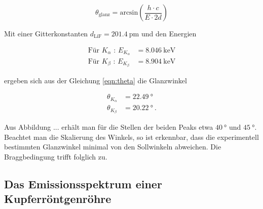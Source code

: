 \begin{equation}
  \theta_\text{glanz} = \text{arcsin}\left(\frac{h \cdot c}{E \cdot 2d}\right)
  \label{eqn:theta}
\end{equation}

Mit einer Gitterkonstanten $d_\text{LiF} = \SI{201.4}{\pico\meter}$ und den Energien

\begin{align*}
   \text{Für } K_\alpha \text{ : } E_{K_\alpha} &= \SI{8.046}{\kilo\eV} \\
   \text{Für } K_\beta \text{ : } E_{K_\beta} &= \SI{8.904}{\kilo\eV}
\end{align*}

ergeben sich aus der Gleichung \eqref{eqn:theta} die Glanzwinkel

\begin{align*}
  \theta_{K_\alpha} &= \SI{22.49}{\degree} \\
  \theta_{K_\beta} &= \SI{20.22}{\degree} \: .
\end{align*}

Aus Abbildung ... erhält man für die Stellen der beiden Peaks etwa $\SI{40}{\degree}$
und $\SI{45}{\degree}$. Beachtet man die Skalierung des Winkels, so ist
erkennbar, dass die experimentell bestimmten Glanzwinkel minimal von den Sollwinkeln
abweichen. Die Braggbedingung trifft folglich zu.

\subsection{Das Emissionsspektrum einer Kupferröntgenröhre}









